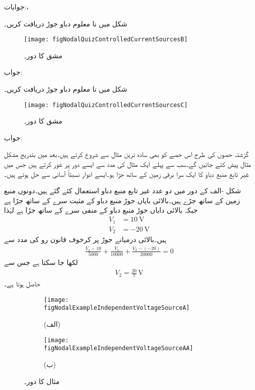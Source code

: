 جوابات:، 


شکل  میں نا معلوم دباو جوڑ  دریافت کریں۔ 
\begin{figure}[!h]
\centering
\texttt{[image: figNodalQuizControlledCurrentSourcesB]}
\caption{مشق  کا دور۔}
\label{شکل_مشق_جوڑ_تابع_منبع_رو_ب}
\end{figure}%

جواب:

شکل  میں نا معلوم دباو جوڑ  دریافت کریں۔ 
\begin{figure}[!h]
\centering
\texttt{[image: figNodalQuizControlledCurrentSourcesC]}
\caption{مشق  کا دور۔}
\label{شکل_مشق_جوڑ_تابع_منبع_رو_پ}
\end{figure}%

جواب:

گزشتہ حصوں کی طرح اس حصے کو بھی سادہ ترین مثال سے شروع کرتے ہیں۔بعد میں بتدریج مشکل مثال پیش کئے جائیں گے۔سب سے پہلے ایک مثال کی مدد سے ایسے دور پر غور کرتے ہیں جس میں غیر تابع منبع دباو کا ایک سرا  برقی زمین کے ساتھ جڑا ہو۔ایسے ادوار نسبتاً آسانی سے حل ہوتے ہیں۔

شکل -الف کے دور میں دو عدد غیر تابع منبع دباو استعمال کئے گئے ہیں۔دونوں منبع  زمین کے ساتھ جڑے ہیں۔بالائی بایاں جوڑ  منبع دباو کے مثبت سرے کے ساتھ جڑا ہے  جبکہ بالائی دایاں جوڑ  منبع دباو کے منفی سرے کے ساتھ جڑا ہے لہٰذا
\begin{align*}
V_1&=\SI{10}{\volt}\\
V_2&=\SI{-20}{\volt}
\end{align*} 
ہیں۔بالائی درمیانے جوڑ پر کرخوف قانون رو کی مدد سے
\begin{align*}
\frac{V_2-10}{5000}+\frac{V_2}{10000}+\frac{V_2-(-20)}{20000}=0
\end{align*}
لکھا جا سکتا ہے جس سے
\begin{align*}
V_2=\frac{20}{7} \, \si{\volt}
\end{align*}
حاصل ہوتا ہے۔
\begin{figure}
\centering
\begin{subfigure}{1\textwidth}
\centering
\texttt{[image: figNodalExampleIndependentVoltageSourceA]}
\caption*{(الف)}
\end{subfigure}
\begin{subfigure}{1\textwidth}
\centering
\texttt{[image: figNodalExampleIndependentVoltageSourceAA]}
\caption*{(ب)}
\end{subfigure}
\caption{مثال  کا دور۔}
\label{شکل_جوڑ_غیر_تابع_منبع_دباو_الف}
\end{figure}%

